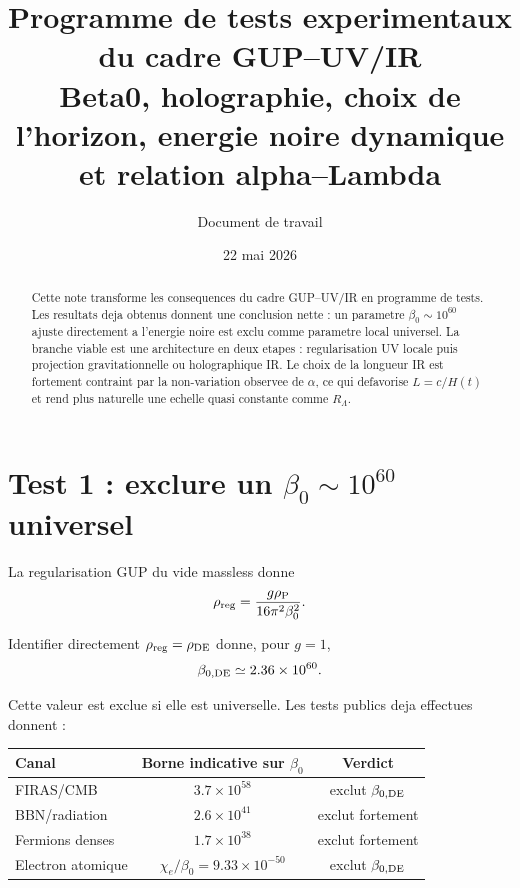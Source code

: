 \documentclass[11pt,a4paper]{article}
\title{Programme de tests experimentaux du cadre GUP--UV/IR\\
\large Beta0, holographie, choix de l'horizon, energie noire dynamique et relation alpha--Lambda}
\author{Document de travail}
\date{22 mai 2026}
\newcommand{\rhoP}{\rho_{\rm P}}
\newcommand{\rhoDE}{\rho_{\rm DE}}
\begin{document}
\maketitle

\begin{abstract}
Cette note transforme les consequences du cadre GUP--UV/IR en programme de
tests. Les resultats deja obtenus donnent une conclusion nette : un parametre
\(\beta_0\sim10^{60}\) ajuste directement a l'energie noire est exclu comme
parametre local universel. La branche viable est une architecture en deux
etapes : regularisation UV locale puis projection gravitationnelle ou
holographique IR. Le choix de la longueur IR est fortement contraint par la
non-variation observee de \(\alpha\), ce qui defavorise \(L=c/H(t)\) et rend
plus naturelle une echelle quasi constante comme \(R_\Lambda\).
\end{abstract}

\tableofcontents
\newpage

\section{Test 1 : exclure un \texorpdfstring{\(\beta_0\sim10^{60}\)}{beta0~10^60} universel}

La regularisation GUP du vide massless donne
\begin{equation}
\rho_{\rm reg}=\frac{g\rhoP}{16\pi^2\beta_0^2}.
\end{equation}

Identifier directement \(\rho_{\rm reg}=\rhoDE\) donne, pour \(g=1\),
\begin{equation}
\beta_{0,\rm DE}\simeq2.36\times10^{60}.
\end{equation}

Cette valeur est exclue si elle est universelle. Les tests publics deja
effectues donnent :
\begin{center}
\begin{tabular}{lcc}
\toprule
Canal & Borne indicative sur \(\beta_0\) & Verdict \\
\midrule
FIRAS/CMB & \(3.7\times10^{58}\) & exclut \(\beta_{0,\rm DE}\) \\
BBN/radiation & \(2.6\times10^{41}\) & exclut fortement \\
Fermions denses & \(1.7\times10^{38}\) & exclut fortement \\
Electron atomique & \(\chi_e/\beta_0=9.33\times10^{-50}\) & exclut \(\beta_{0,\rm DE}\) \\
\bottomrule
\end{tabular}
\end{center}
\end{document}
